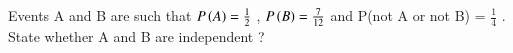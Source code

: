\begin{flushleft}
Events A and B are such that $P\left(A\right) = \frac{1}{2}$ , $P\left(B\right) = \frac{7}{12}$
and P(not A or not B) = $\frac{1}{4}$ . State whether A and B are independent ?
\end{flushleft}